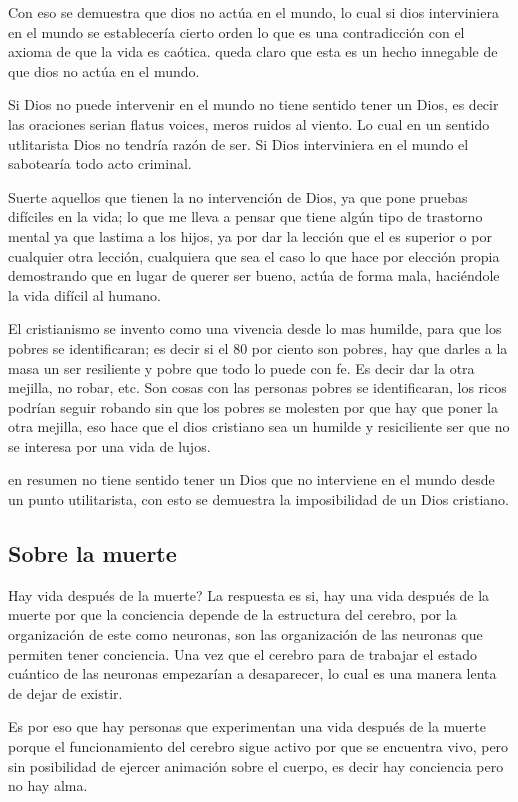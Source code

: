 \documentclass[12pt,letterpaper, a4paper ]{article}
\begin{document}
Con eso se demuestra que dios no actúa en el mundo, lo cual si dios interviniera en el mundo se establecería cierto orden lo que es una contradicción con el axioma de que la vida es caótica. queda claro que esta es un hecho innegable de que dios no actúa en el mundo.

Si Dios no puede intervenir en el mundo no tiene sentido tener un Dios, es decir las oraciones serian flatus voices, meros ruidos al viento. Lo cual en un sentido utlitarista Dios no tendría razón de ser. Si Dios interviniera en el mundo el sabotearía todo acto criminal.

Suerte aquellos que tienen la no intervención de Dios, ya que pone pruebas difíciles en la vida; lo que me lleva a pensar que tiene algún tipo de trastorno mental ya que lastima a los hijos, ya por dar la lección que el es superior o por cualquier otra lección, cualquiera que sea el caso lo que hace por elección propia demostrando que en lugar de querer ser bueno, actúa de forma mala, haciéndole la vida difícil al humano.


El cristianismo se invento como una vivencia desde lo mas humilde, para que los pobres se identificaran; es decir si el 80 por ciento son pobres, hay que darles a la masa un ser resiliente y pobre que todo lo puede con fe. Es decir dar la otra mejilla, no robar, etc. Son cosas con las personas pobres se identificaran, los ricos podrían seguir robando sin que los pobres se molesten por que hay que poner la otra mejilla, eso hace que el dios cristiano sea un humilde y resiciliente ser que no se interesa por una vida de lujos.

en resumen no tiene sentido tener un Dios que no interviene en el mundo desde un punto utilitarista, con esto se demuestra la imposibilidad de un Dios cristiano.



\subsection{Sobre la muerte}

Hay vida después de la muerte? La respuesta es si, hay una vida después de la muerte por que la conciencia depende de la estructura del cerebro, por la organización de este como neuronas, son las organización de las neuronas que permiten tener conciencia. Una vez que el cerebro para de trabajar el estado cuántico de las neuronas empezarían a desaparecer, lo cual es una manera lenta de dejar de existir.

Es por eso que hay personas que experimentan una vida después de la muerte porque el funcionamiento del cerebro sigue activo por que se encuentra vivo, pero sin posibilidad de ejercer animación sobre el cuerpo, es decir hay conciencia pero no hay alma.
\end{document}
